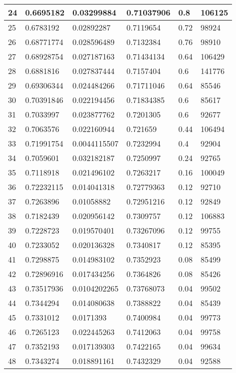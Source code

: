 \begin{longtable}{|l|l|l|l|l|l|}
24 & 0.6695182 & 0.03299884 & 0.71037906 & 0.8 & 106125 \\ \hline 
25 & 0.6783192 & 0.02892287 & 0.7119654 & 0.72 & 98924 \\ \hline 
26 & 0.68771774 & 0.028596489 & 0.7132384 & 0.76 & 98910 \\ \hline 
27 & 0.68928754 & 0.027187163 & 0.71434134 & 0.64 & 106429 \\ \hline 
28 & 0.6881816 & 0.027837444 & 0.7157404 & 0.6 & 141776 \\ \hline 
29 & 0.69306344 & 0.024484266 & 0.71711046 & 0.64 & 85546 \\ \hline 
30 & 0.70391846 & 0.022194456 & 0.71834385 & 0.6 & 85617 \\ \hline 
31 & 0.7033997 & 0.023877762 & 0.7201305 & 0.6 & 92677 \\ \hline 
32 & 0.7063576 & 0.022160944 & 0.721659 & 0.44 & 106494 \\ \hline 
33 & 0.71991754 & 0.0044115507 & 0.7232994 & 0.4 & 92904 \\ \hline 
34 & 0.7059601 & 0.032182187 & 0.7250997 & 0.24 & 92765 \\ \hline 
35 & 0.7118918 & 0.021496102 & 0.7263217 & 0.16 & 100049 \\ \hline 
36 & 0.72232115 & 0.014041318 & 0.72779363 & 0.12 & 92710 \\ \hline 
37 & 0.7263896 & 0.01058882 & 0.72951216 & 0.12 & 92849 \\ \hline 
38 & 0.7182439 & 0.020956142 & 0.7309757 & 0.12 & 106883 \\ \hline 
39 & 0.7228723 & 0.019570401 & 0.73267096 & 0.12 & 99755 \\ \hline 
40 & 0.7233052 & 0.020136328 & 0.7340817 & 0.12 & 85395 \\ \hline 
41 & 0.7298875 & 0.014983102 & 0.7352923 & 0.08 & 85499 \\ \hline 
42 & 0.72896916 & 0.017434256 & 0.7364826 & 0.08 & 85426 \\ \hline 
43 & 0.73517936 & 0.0104202265 & 0.73768073 & 0.04 & 99502 \\ \hline 
44 & 0.7344294 & 0.014080638 & 0.7388822 & 0.04 & 85439 \\ \hline 
45 & 0.7331012 & 0.0171393 & 0.7400984 & 0.04 & 99773 \\ \hline 
46 & 0.7265123 & 0.022445263 & 0.7412063 & 0.04 & 99758 \\ \hline 
47 & 0.7352193 & 0.017139303 & 0.7422165 & 0.04 & 99634 \\ \hline 
48 & 0.7343274 & 0.018891161 & 0.7432329 & 0.04 & 92588 \\ \hline 

\end{longtable}
